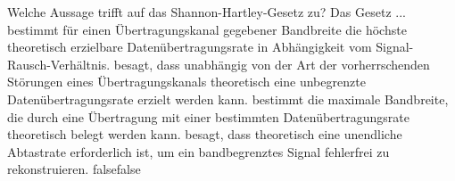     {Welche Aussage trifft auf das Shannon-Hartley-Gesetz zu? Das Gesetz ...}
    {bestimmt für einen Übertragungskanal gegebener Bandbreite die höchste theoretisch erzielbare Datenübertragungsrate in Abhängigkeit vom Signal-Rausch-Verhältnis.}
    {besagt, dass unabhängig von der Art der vorherrschenden Störungen eines Übertragungskanals theoretisch eine unbegrenzte Datenübertragungsrate erzielt werden kann.}
    {bestimmt die maximale Bandbreite, die durch eine Übertragung mit einer bestimmten Datenübertragungsrate theoretisch belegt werden kann.}
    {besagt, dass theoretisch eine unendliche Abtastrate erforderlich ist, um ein bandbegrenztes Signal fehlerfrei zu rekonstruieren.}
    {false}{false}